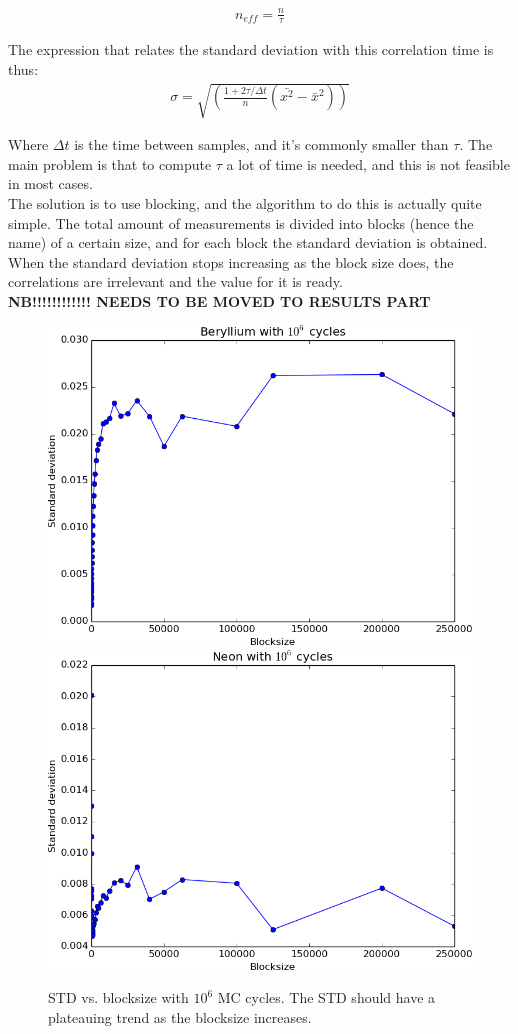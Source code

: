 		\begin{align}
			n_{eff}=\frac{n}{\tau}
		\end{align}

		The expression that relates the standard deviation with this correlation time is thus:\\

		\begin{align}
			\sigma=\sqrt{\left(\frac{1+2\tau/\Delta t}{n}\left(\bar{x^2}-\bar{x}^2\right)\right)}
		\end{align}

		Where $\Delta t$ is the time between samples, and it's commonly smaller than $\tau$. The main problem is that to compute $\tau$ a lot of time is needed, and this is not feasible in most cases.\\

		The solution is to use blocking, and the algorithm to do this is actually quite simple. The total amount of measurements is divided into blocks (hence the name) of a certain size, and for each block the standard deviation is obtained. When the standard deviation stops increasing as the block size does, the correlations are irrelevant and the value for it is ready.\\

\textbf{NB!!!!!!!!!!!! NEEDS TO BE MOVED TO RESULTS PART}

		\begin{figure}
			\centering \includegraphics[width=0.45\linewidth]{../figures/Beryllium_blocking}
			\centering \includegraphics[width=0.45\linewidth]{../figures/Neon_blocking}
			\protect\caption{STD vs. blocksize with $10^6$ MC cycles. The STD should have a plateauing trend as the blocksize increases.}\label{fig01:std_Stuff}
		\end{figure}


